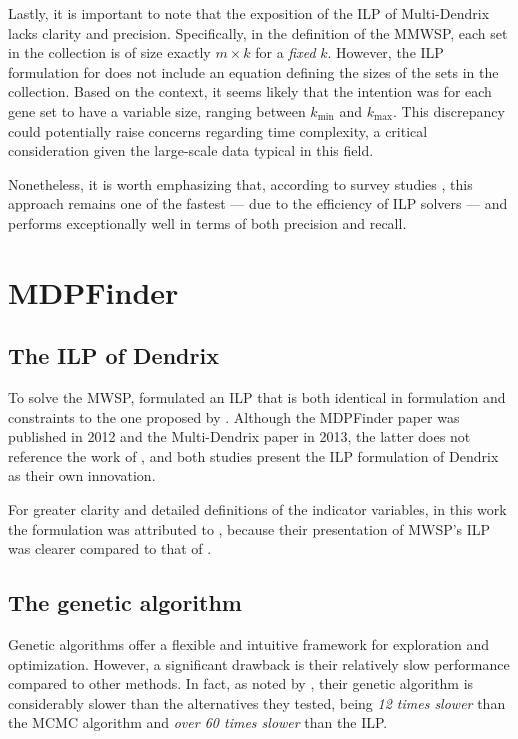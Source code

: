 Lastly, it is important to note that the exposition of the ILP of Multi-Dendrix lacks clarity and precision. Specifically, in the definition of the MMWSP, each set in the collection is of size exactly $m \times k$ for a \textit{fixed} $k$. However, the ILP formulation for does not include an equation defining the sizes of the sets in the collection. Based on the context, it seems likely that the intention was for each gene set to have a variable size, ranging between $k_\mathrm{min}$ and $k_\mathrm{max}$. This discrepancy could potentially raise concerns regarding time complexity, a critical consideration given the large-scale data typical in this field.

Nonetheless, it is worth emphasizing that, according to survey studies \cite{survey}, this approach remains one of the fastest --- due to the efficiency of ILP solvers --- and performs exceptionally well in terms of both precision and recall.

\section{MDPFinder}

\subsection{The ILP of Dendrix}

To solve the MWSP, \textcite{mdpfinder} formulated an ILP that is both identical in formulation and constraints to the one proposed by \textcite{multi-dendrix}. Although the MDPFinder paper was published in 2012 and the Multi-Dendrix paper in 2013, the latter does not reference the work of \textcite{mdpfinder}, and both studies present the ILP formulation of Dendrix as their own innovation.

For greater clarity and detailed definitions of the indicator variables, in this work the formulation was attributed to \textcite{multi-dendrix}, because their presentation of MWSP's ILP was clearer compared to that of \textcite{mdpfinder}.

\subsection{The genetic algorithm}

Genetic algorithms offer a flexible and intuitive framework for exploration and optimization. However, a significant drawback is their relatively slow performance compared to other methods. In fact, as noted by \textcite{mdpfinder}, their genetic algorithm is considerably slower than the alternatives they tested, being \textit{12 times slower} than the MCMC algorithm and \textit{over 60 times slower} than the ILP.

